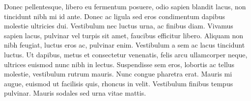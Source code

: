 Donec pellentesque, libero eu fermentum posuere, odio sapien blandit lacus, non tincidunt nibh mi id ante. Donec ac ligula sed eros condimentum dapibus molestie ultricies dui. Vestibulum nec luctus urna, ac finibus diam. Vivamus sapien lacus, pulvinar vel turpis sit amet, faucibus efficitur libero. Aliquam non nibh feugiat, luctus eros ac, pulvinar enim. Vestibulum a sem ac lacus tincidunt luctus. Ut dapibus, metus et consectetur venenatis, felis arcu ullamcorper neque, ultrices euismod nunc nibh in lectus. Suspendisse sem eros, lobortis ac tellus molestie, vestibulum rutrum mauris. Nunc congue pharetra erat. Mauris mi augue, euismod ut facilisis quis, rhoncus in velit. Vestibulum finibus tempus pulvinar. Mauris sodales sed urna vitae mattis.
